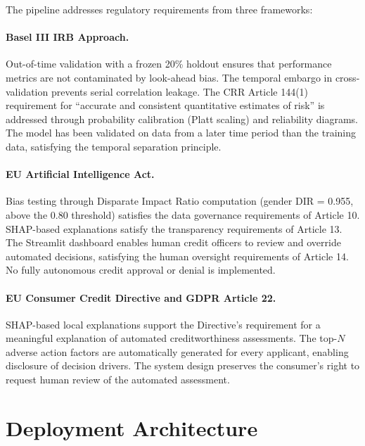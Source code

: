 \documentclass[11pt, a4paper]{article}
\begin{document}
The pipeline addresses regulatory requirements from three frameworks:

\paragraph{Basel III IRB Approach.} Out-of-time validation with a frozen 20\% holdout ensures that performance metrics are not contaminated by look-ahead bias. The temporal embargo in cross-validation prevents serial correlation leakage. The CRR Article 144(1) requirement for ``accurate and consistent quantitative estimates of risk'' is addressed through probability calibration (Platt scaling) and reliability diagrams. The model has been validated on data from a later time period than the training data, satisfying the temporal separation principle.

\paragraph{EU Artificial Intelligence Act.} Bias testing through Disparate Impact Ratio computation (gender DIR = 0.955, above the 0.80 threshold) satisfies the data governance requirements of Article 10. SHAP-based explanations satisfy the transparency requirements of Article 13. The Streamlit dashboard enables human credit officers to review and override automated decisions, satisfying the human oversight requirements of Article 14. No fully autonomous credit approval or denial is implemented.

\paragraph{EU Consumer Credit Directive and GDPR Article 22.} SHAP-based local explanations support the Directive's requirement for a meaningful explanation of automated creditworthiness assessments. The top-$N$ adverse action factors are automatically generated for every applicant, enabling disclosure of decision drivers. The system design preserves the consumer's right to request human review of the automated assessment.

\section{Deployment Architecture}
\label{sec:deployment}
\end{document}
